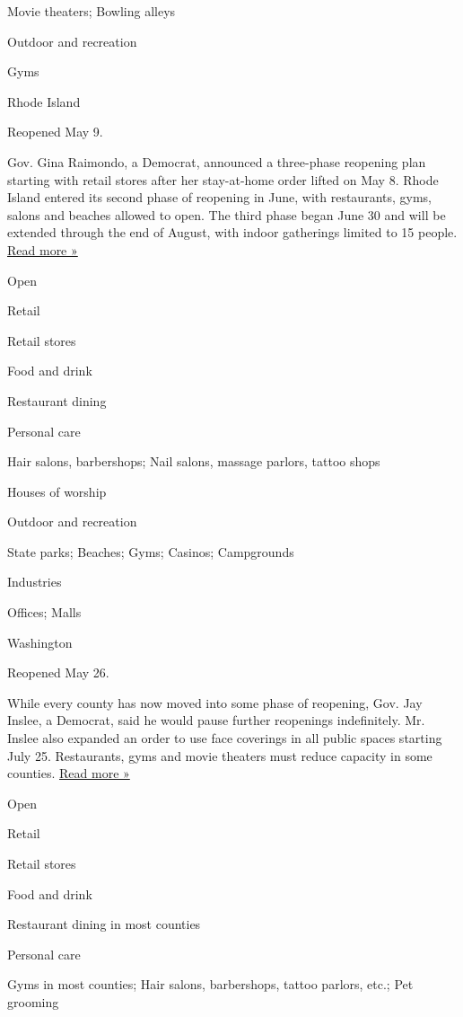 Movie theaters; Bowling alleys

Outdoor and recreation

Gyms

Rhode Island

Reopened May 9.

Gov. Gina Raimondo, a Democrat, announced a three-phase reopening plan
starting with retail stores after her stay-at-home order lifted on May
8. Rhode Island entered its second phase of reopening in June, with
restaurants, gyms, salons and beaches allowed to open. The third phase
began June 30 and will be extended through the end of August, with
indoor gatherings limited to 15 people.
\href{https://www.wpri.com/health/coronavirus/july-29-ri-coronavirus-update/}{Read
more »}

Open

Retail

Retail stores

Food and drink

Restaurant dining

Personal care

Hair salons, barbershops; Nail salons, massage parlors, tattoo shops

Houses of worship

Outdoor and recreation

State parks; Beaches; Gyms; Casinos; Campgrounds

Industries

Offices; Malls

Washington

Reopened May 26.

While every county has now moved into some phase of reopening, Gov. Jay
Inslee, a Democrat, said he would pause further reopenings indefinitely.
Mr. Inslee also expanded an order to use face coverings in all public
spaces starting July 25. Restaurants, gyms and movie theaters must
reduce capacity in some counties.
\href{https://www.seattlepi.com/coronavirus/article/inslee-extends-phase-pause-indefinitely-wa-state-15441125.php}{Read
more »}

Open

Retail

Retail stores

Food and drink

Restaurant dining in most counties

Personal care

Gyms in most counties; Hair salons, barbershops, tattoo parlors, etc.;
Pet grooming

